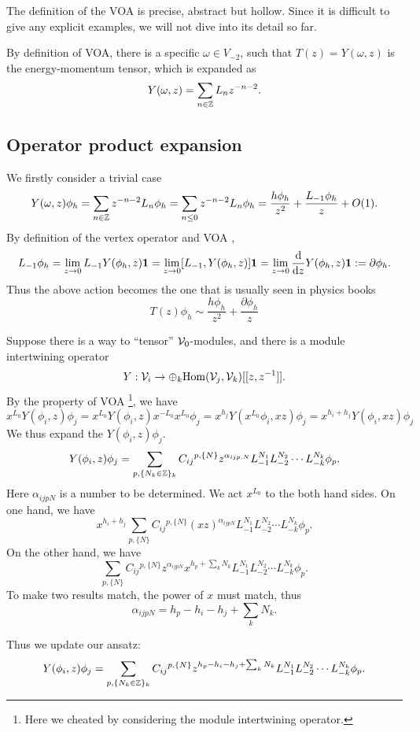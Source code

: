 \documentclass{article}
\begin{document}
The definition of the VOA is precise, abstract but hollow. Since it is difficult to give any explicit examples, we will not dive into its detail so far.

By definition of VOA, there is a specific $\omega\in V_{-2}$, such that $T(z) = Y(\omega, z)$ is the energy-momentum tensor, which is expanded as
\[
Y(\omega, z) = \sum_{n\in\mathbb{Z}}L_n z^{-n-2}.
\]

\subsection{Operator product expansion}
We firstly consider a trivial case
\[
Y(\omega, z)\phi_h = \sum_{n\in\mathbb{Z}}z^{-n-2}L_n\phi_h = \sum_{n\leq 0}z^{-n-2}L_n\phi_h = \frac{h\phi_h}{z^2}+\frac{L_{-1}\phi_h}{z}+O(1).
\]
By definition of the vertex operator and VOA \cite{vertex_operator_algebra:Wikipedia}, 
\[
L_{-1}\phi_h = \lim_{z\rightarrow 0}L_{-1}Y(\phi_h, z)\mathbf{1} = \lim_{z\rightarrow 0}[L_{-1},Y(\phi_h, z)]\mathbf{1} = \lim_{z\rightarrow 0}\frac{\mathrm{d}}{\mathrm{d} z}Y(\phi_h, z)\mathbf{1} := \partial \phi_h.
\]
Thus the above action becomes the one that is usually seen in physics books
\[
T(z)\phi_h \sim \frac{h\phi_h}{z^2}+\frac{\partial \phi_h}{z}
\]


Suppose there is a way to ``tensor'' ${\cal V}_0$-modules, and there is a module intertwining operator
\[
Y:{\cal V}_i\rightarrow \oplus_{k}\mathrm{Hom}({\cal V}_{j},{\cal V}_{k})[[z,z^{-1}]].
\]
By the property of VOA \cite{vertex_operator_algebra:Wikipedia}\footnote{Here we cheated by considering the module intertwining operator.}, we have
\[
x^{L_0}Y(\phi_i, z)\phi_j = x^{L_0}Y(\phi_i, z) x^{-L_0} x^{L_0}\phi_j = x^{h_j}Y(x^{L_0} \phi_i, xz)\phi_j =x^{h_i + h_j}Y(\phi_i, xz)\phi_j
\]
We thus expand the $Y(\phi_i, z)\phi_j$. 
\[
Y(\phi_i, z)\phi_j = \sum_{p, \{N_k\in\mathbb{Z}\}_{k}}C_{ij}{}^{p,\{N\}}z^{\alpha_{ijp,{N}}}L_{-1}^{N_1}L_{-2}^{N_2}\cdots L_{-k}^{N_k}\phi_p.
\]
Here $\alpha_{ijpN}$ is a number to be determined.
We act $x^{L_0}$ to the both hand sides. On one hand, we have
\[
x^{h_i+h_j}\sum_{p,\{N\}}C_{ij}{}^{p,\{N\}}(xz)^{\alpha_{ijp{N}}}L_{-1}^{N_1}L_{-2}^{N_2}\cdots L_{-k}^{N_k}\phi_p.
\]
On the other hand, we have
\[
\sum_{p,\{N\}}C_{ij}{}^{p,\{N\}}z^{\alpha_{ijpN}}x^{h_p+\sum_{k}N_k}L_{-1}^{N_1}L_{-2}^{N_2}\cdots L_{-k}^{N_k}\phi_p.
\]
To make two results match, the power of $x$ must match, thus
\[
\alpha_{ijpN} = h_p-h_i-h_j+\sum_{k}N_k.
\]

Thus we update our ansatz:
\[
Y(\phi_i, z)\phi_j = \sum_{p, \{N_k\in\mathbb{Z}\}_{k}}C_{ij}{}^{p,\{N\}}z^{h_p-h_i-h_j+\sum_{k}N_k}L_{-1}^{N_1}L_{-2}^{N_2}\cdots L_{-k}^{N_k}\phi_p.
\]
\end{document}
